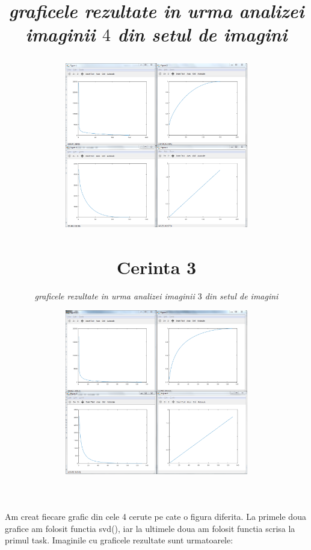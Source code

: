 \documentclass{article}
\begin{document}
\paragraph{}
Am creat fiecare grafic din cele 4 cerute pe cate o figura diferita. La primele
doua grafice am folosit functia svd(), iar la ultimele doua am folosit functia
scrisa la primul task. Imaginile cu graficele rezultate sunt urmatoarele:
\bigbreak
\title{\textit{graficele rezultate in urma analizei imaginii $3$ din setul de imagini \\}
\begin{center}
\includegraphics[width=80mm]{grafice_task2_imaginea3.png}
\end{center}
\bigbreak
\title{\textit{graficele rezultate in urma analizei imaginii $4$ din setul de imagini \\}
\begin{center}
\includegraphics[width=80mm]{grafice_task2_imaginea4.png}
\end{center}

\section{Cerinta 3}
}}
\end{document}
